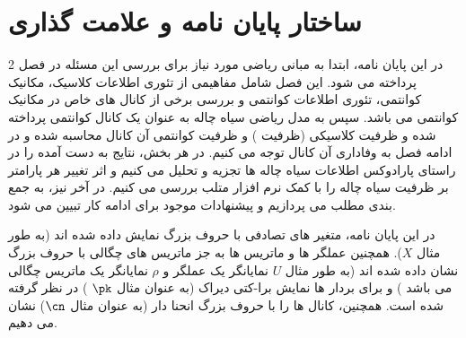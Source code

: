 \section{ساختار پایان نامه و علامت گذاری}
%
%
در این پایان نامه، ابتدا به مبانی ریاضی مورد نیاز برای بررسی این مسئله در فصل 2 پرداخته می شود. این فصل شامل مفاهیمی از تئوری اطلاعات کلاسیک، مکانیک کوانتمی، تئوری اطلاعات کوانتمی و بررسی برخی از کانال های خاص در مکانیک کوانتمی می باشد. 
سپس به مدل ریاضی سیاه چاله به عنوان یک کانال کوانتمی پرداخته شده و ظرفیت کلاسیکی (ظرفیت  
)
و ظرفیت کوانتمی آن کانال محاسبه شده و در ادامه فصل به وفاداری
آن  کانال توجه می کنیم. در هر بخش، نتایج به دست آمده را در راستای پارادوکس اطلاعات سیاه چاله ها تجزیه و تحلیل می کنیم و اثر تغییر هر پارامتر بر ظرفیت سیاه چاله را با کمک نرم افزار متلب
بررسی می کنیم.
 در آخر نیز، به جمع بندی مطلب می پردازیم و پیشنهادات موجود برای ادامه کار تبیین می شود.
 
 در این پایان نامه، متغیر های تصادفی با حروف بزرگ 
  نمایش داده شده اند (به طور مثال 
 $X$).
  همچنین عملگر ها و ماتریس ها به جز ماتریس های چگالی با حروف بزرگ نشان داده شده اند  (به طور مثال
  $U$
  نمایانگر یک عملگر و 
  $\rho$
  نمایانگر یک ماتریس چگالی می باشد
   ) و 
  برای بردار ها نمایش برا-کتی دیراک (به عنوان مثال 
  $\pk$
  ) در نظر گرفته شده است. همچنین، کانال ها را با حروف بزرگ انحنا دار (به عنوان مثال 
  $\cn$)
  نشان می دهیم.
